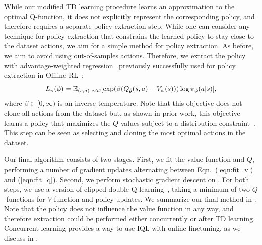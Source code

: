 \documentclass{article} %
\def\ourname{IQL\xspace}
\begin{document}
While our modified TD learning procedure learns an approximation to the optimal Q-function, it does not explicitly represent the corresponding policy, and therefore requires a separate policy extraction step. While one can consider any technique for policy extraction that constrains the learned policy to stay close to the dataset actions,
we aim for a simple method for policy extraction. As before, we aim to avoid using out-of-samples actions. Therefore, we extract the policy with advantage-weighted regression~\citep{peters2007reinforcement, peng2019advantage} previously successfully used for policy extraction in Offline RL~\citep{wang2018exponentially,nair2020awac, brandfonbrener2021offline}:
\begin{equation}
    L_\pi(\phi) = \mathbb{E}_{(s,a)~\sim \mathcal{D}}[\exp(\beta(Q_{\hat{\theta}}(s,a) - V_\psi(s)))\log \pi_\phi(a|s)],
    \label{eqn:awr}
\end{equation}
where $\beta \in [0, \infty)$  is an inverse temperature. %
Note that this objective does not clone all actions from the dataset but, as shown in prior work, this objective learns a policy that maximizes the $Q$-values subject to a distribution constraint~\citep{peters2007reinforcement,peng2019advantage,nair2020awac}. This step can be seen as selecting and cloning the most optimal actions in the dataset.

Our final algorithm consists of two stages. First, we fit the value function and $Q$, performing a number of gradient updates alternating between Eqn.~(\ref{eqn:fit_v}) and (\ref{eqn:fit_q}). Second, we perform stochastic gradient descent on .
For both steps, we use a version of clipped double Q-learning~\citep{fujimoto2018addressing}, taking a minimum of two $Q$-functions for $V$-function and policy updates.
We summarize our final method in . Note that the policy does not influence the value function in any way, and therefore extraction could be performed either concurrently or after TD learning. Concurrent learning provides a way to use \ourname with online finetuning, as we discuss in .
\end{document}
